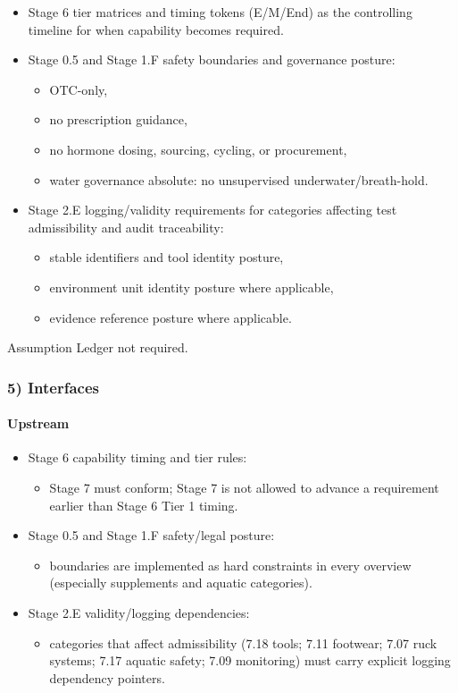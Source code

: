 \documentclass[10pt]{article}
\begin{document}
\begin{itemize}
\item Stage 6 tier matrices and timing tokens (E/M/End) as the controlling timeline for when capability becomes required.
\item Stage 0.5 and Stage 1.F safety boundaries and governance posture:
  \begin{itemize}
  \item OTC-only,
  \item no prescription guidance,
  \item no hormone dosing, sourcing, cycling, or procurement,
  \item water governance absolute: no unsupervised underwater/breath-hold.
  \end{itemize}
\item Stage 2.E logging/validity requirements for categories affecting test admissibility and audit traceability:
  \begin{itemize}
  \item stable identifiers and tool identity posture,
  \item environment unit identity posture where applicable,
  \item evidence reference posture where applicable.
  \end{itemize}
\end{itemize}

Assumption Ledger not required.

\subsubsection*{5) Interfaces}

\paragraph*{Upstream}

\begin{itemize}
\item Stage 6 capability timing and tier rules:
  \begin{itemize}
  \item Stage 7 must conform; Stage 7 is not allowed to advance a requirement earlier than Stage 6 Tier 1 timing.
  \end{itemize}
\item Stage 0.5 and Stage 1.F safety/legal posture:
  \begin{itemize}
  \item boundaries are implemented as hard constraints in every overview (especially supplements and aquatic categories).
  \end{itemize}
\item Stage 2.E validity/logging dependencies:
  \begin{itemize}
  \item categories that affect admissibility (7.18 tools; 7.11 footwear; 7.07 ruck systems; 7.17 aquatic safety; 7.09 monitoring) must carry explicit logging dependency pointers.
  \end{itemize}
\end{itemize}
\end{document}
